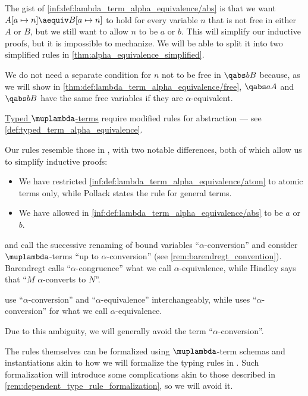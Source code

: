\begin{comments}
  \item The gist of \ref{inf:def:lambda_term_alpha_equivalence/abs} is that we want \( A[a \mapsto n] \aequiv B[a \mapsto n] \) to hold for every variable \( n \) that is not free in either \( A \) or \( B \), but we still want to allow \( n \) to be \( a \) or \( b \). This will simplify our inductive proofs, but it is impossible to mechanize. We will be able to split it into two simplified rules in \cref{thm:alpha_equivalence_simplified}.

  \item We do not need a separate condition for \( n \) not to be free in \( \qabs b B \) because, as we will show in \cref{thm:def:lambda_term_alpha_equivalence/free}, \( \qabs a A \) and \( \qabs b B \) have the same free variables if they are \( \alpha \)-equivalent.

  \item \hyperref[def:typed_lambda_term]{Typed \( \muplambda \)-terms} require modified rules for abstraction --- see \cref{def:typed_term_alpha_equivalence}.

  \item Our rules resemble those in \cite[5]{Pollack2005AlphaConversion}, with two notable differences, both of which allow us to simplify inductive proofs:
  \begin{itemize}
    \item We have restricted \ref{inf:def:lambda_term_alpha_equivalence/atom} to atomic terms only, while Pollack states the rule for general terms.
    \item We have allowed in \ref{inf:def:lambda_term_alpha_equivalence/abs} to be \( a \) or \( b \).
  \end{itemize}

  \item \Textcite[\S 2.1.11]{Barendregt1984LambdaCalculus} and \textcite[def. 1A8]{Hindley1997BasicSTT} call the successive renaming of bound variables \enquote{\( \alpha \)-conversion} and consider \( \muplambda \)-terms \enquote{up to \( \alpha \)-conversion} (see \cref{rem:barendregt_convention}). Barendregt calls \enquote{\( \alpha \)-congruence} what we call \( \alpha \)-equivalence, while Hindley says that \enquote{\( M \) \( \alpha \)-converts to \( N \)}.

  \textcite[5]{Pollack2005AlphaConversion} use \enquote{\( \alpha \)-conversion} and \enquote{\( \alpha \)-equivalence} interchangeably, while \textcite[114]{Mimram2020ProgramEqualsProof} uses \enquote{\( \alpha \)-conversion} for what we call \( \alpha \)-equivalence.

  Due to this ambiguity, we will generally avoid the term \enquote{\( \alpha \)-conversion}.

  \item The rules themselves can be formalized using \( \muplambda \)-term schemas and instantiations akin to how we will formalize the typing rules in . Such formalization will introduce some complications akin to those described in \cref{rem:dependent_type_rule_formalization}, so we will avoid it.
\end{comments}

